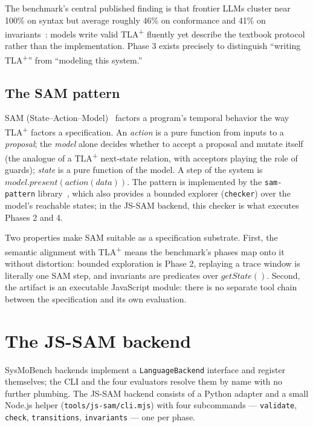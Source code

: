\documentclass[11pt]{article}
\newcommand{\jssam}{JS-SAM}
\newcommand{\tlaplus}{TLA\texorpdfstring{\textsuperscript{+}}{+}}
\begin{document}
The benchmark's central published finding is that frontier LLMs cluster near
100\% on syntax but average roughly 46\% on conformance and 41\% on
invariants~\cite{sigops2026}: models write valid \tlaplus{} fluently yet
describe the textbook protocol rather than the implementation. Phase 3 exists
precisely to distinguish ``writing \tlaplus{}'' from ``modeling this system.''

\subsection{The SAM pattern}

SAM (State--Action--Model)~\cite{sam,dubray2016infoq} factors a program's
temporal behavior the way \tlaplus{} factors a specification. An
\emph{action} is a pure function from inputs to a \emph{proposal}; the
\emph{model} alone decides whether to accept a proposal and mutate itself
(the analogue of a \tlaplus{} next-state relation, with acceptors playing the
role of guards); \emph{state} is a pure function of the model. A step of the
system is $\mathit{model.present}(\mathit{action}(\mathit{data}))$. The
pattern is implemented by the \texttt{sam-pattern}
library~\cite{sampattern}, which also provides a bounded explorer
(\texttt{checker}) over the model's reachable states; in the \jssam{}
backend, this checker is what executes Phases 2 and 4.

Two properties make SAM suitable as a specification substrate. First, the
semantic alignment with \tlaplus{} means the benchmark's phases map onto it
without distortion: bounded exploration is Phase 2, replaying a trace window
is literally one SAM step, and invariants are predicates over
$\mathit{getState}()$. Second, the artifact is an executable JavaScript
module: there is no separate tool chain between the specification and its
own evaluation.

\section{The \jssam{} backend}
\label{sec:backend}

SysMoBench backends implement a \texttt{LanguageBackend} interface and
register themselves; the CLI and the four evaluators resolve them by name with
no further plumbing. The \jssam{} backend consists of a Python adapter and a
small Node.js helper (\texttt{tools/js-sam/cli.mjs}) with four subcommands ---
\texttt{validate}, \texttt{check}, \texttt{transitions},
\texttt{invariants} --- one per phase.
\end{document}
